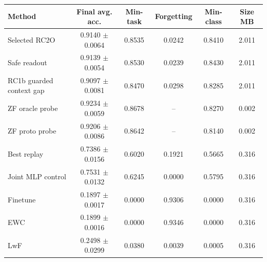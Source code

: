 \begin{tabularx}{\linewidth}{lccccc}
\toprule
Method & Final avg. acc. & Min-task & Forgetting & Min-class & Size MB \\
\midrule
Selected RC2O & 0.9140 $\pm$ 0.0064 & 0.8535 & 0.0242 & 0.8410 & 2.011 \\
Safe readout & 0.9139 $\pm$ 0.0054 & 0.8530 & 0.0239 & 0.8430 & 2.011 \\
RC1b guarded context gap & 0.9097 $\pm$ 0.0081 & 0.8470 & 0.0298 & 0.8285 & 2.011 \\
ZF oracle probe & 0.9234 $\pm$ 0.0059 & 0.8678 & -- & 0.8270 & 0.002 \\
ZF proto probe & 0.9206 $\pm$ 0.0086 & 0.8642 & -- & 0.8140 & 0.002 \\
Best replay & 0.7386 $\pm$ 0.0156 & 0.6020 & 0.1921 & 0.5665 & 0.316 \\
Joint MLP control & 0.7531 $\pm$ 0.0132 & 0.6245 & 0.0000 & 0.5795 & 0.316 \\
Finetune & 0.1897 $\pm$ 0.0017 & 0.0000 & 0.9306 & 0.0000 & 0.316 \\
EWC & 0.1899 $\pm$ 0.0016 & 0.0000 & 0.9346 & 0.0000 & 0.316 \\
LwF & 0.2498 $\pm$ 0.0299 & 0.0380 & 0.0039 & 0.0005 & 0.316 \\
\bottomrule
\end{tabularx}